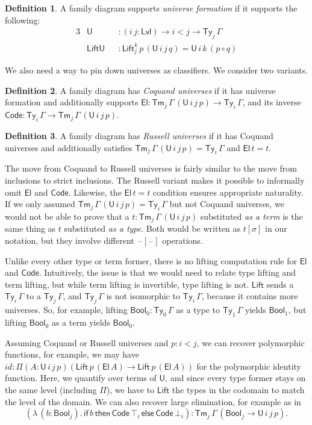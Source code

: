 \documentclass[a4paper,UKenglish,cleveref, autoref, thm-restate]{lipics-v2021}
\theoremstyle{remark}
\theoremstyle{definition}
\newtheorem{mydefinition}{Definition}
\newcommand{\Ty}{\mathsf{Ty}}
\newcommand{\Tm}{\mathsf{Tm}}
\newcommand{\U}{\mathsf{U}}
\newcommand{\El}{\mathsf{El}}
\newcommand{\blank}{\mathord{\hspace{1pt}\text{--}\hspace{1pt}}}
\newcommand{\mi}[1]{\mathit{#1}}
\newcommand{\Bool}{\mathsf{Bool}}
\newcommand{\Lift}{\mathsf{Lift}}
\newcommand{\Lvl}{\mathsf{Lvl}}
\renewcommand{\U}{\mathsf{U}}
\newcommand{\Code}{\mathsf{Code}}
\begin{document}
\begin{mydefinition} A family diagram supports \emph{universe formation} if it supports the following:
\begin{alignat*}{3}
  & \U             &&: (i\,j : \Lvl) \to i < j \to \Ty_j\,\Gamma\\
  & \mathsf{LiftU} &&: \Lift_{j}^{k}\,p\,(\U\,i\,j\,q) = \U\,i\,k\,(p \circ q)
\end{alignat*}
\end{mydefinition}
We also need a way to pin down universes as classifiers. We consider two variants.
\begin{mydefinition}
A family diagram has \emph{Coquand universes} if it has universe formation and
additionally supports $\El : \Tm_j\,\Gamma\,(\U\,i\,j\,p) \to \Ty_i\,\Gamma$, and
its inverse $\Code : \Ty_i\,\Gamma \to \Tm_j\,\Gamma\,(\U\,i\,j\,p)$.
\end{mydefinition}
\begin{mydefinition}
A family diagram has \emph{Russell universes} if it has Coquand universes and
additionally satisfies $\Tm_j\,\Gamma\,(\U\,i\,j\,p) = \Ty_i\,\Gamma$ and
$\El\,t = t$.
\end{mydefinition}

The move from Coquand to Russell universes is fairly similar to the move from
inclusions to strict inclusions. The Russell variant makes it possible to
informally omit $\El$ and $\Code$. Likewise, the $\El\,t = t$ condition ensures
appropriate naturality. If we only assumed $\Tm_j\,\Gamma\,(\U\,i\,j\,p) =
\Ty_i\,\Gamma$ but not Coquand universes, we would not be able to prove that a
$t : \Tm_j\,\Gamma\,(\U\,i\,j\,p)$ substituted \emph{as a term} is the same
thing as $t$ substituted \emph{as a type}. Both would be written as $t[\sigma]$
in our notation, but they involve different $\blank[\blank]$ operations.

Unlike every other type or term former, there is no lifting computation rule for
$\El$ and $\Code$. Intuitively, the issue is that we would need to relate type
lifting and term lifting, but while term lifting is invertible, type lifting is
not. $\Lift$ sends a $\Ty_i\,\Gamma$ to a $\Ty_j\,\Gamma$, and $\Ty_j\,\Gamma$
is not isomorphic to $\Ty_i\,\Gamma$, because it contains more universes. So,
for example, lifting $\Bool_0 : \Ty_0\,\Gamma$ as a type to $\Ty_1\,\Gamma$
yields $\Bool_1$, but lifting $\Bool_0$ as a term yields $\Bool_0$.

Assuming Coquand or Russell universes and $p : i < j$, we can recover
polymorphic functions, for example, we may have $\mi{id} : \Pi(A : \U\,i\,j\,p)
(\Lift\,p\,(\El\,A) \to \Lift\,p\,(\El\,A))$ for the polymorphic identity
function. Here, we quantify over terms of $\U$, and since every type former
stays on the same level (including $\Pi$), we have to $\Lift$ the types in the
codomain to match the level of the domain. We can also recover large
elimination, for example as in
\[
(\lambda\,(b : \Bool_j).\,\mathsf{if}\,b\,\mathsf{then}\,\Code\,\top_i\,\mathsf{else}\,\Code\,\bot_i)
: \Tm_j\,\Gamma\,(\Bool_j \to \U\,i\,j\,p).
\]
\end{document}
